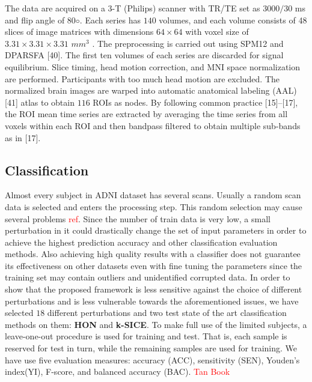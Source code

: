 \documentclass[preprint,12pt]{elsarticle}
\begin{document}
The data are acquired on a $3$-T (Philips) scanner with TR/TE set as $3000/30$
ms and flip angle of $80◦$. Each series has $140$ volumes, and each volume consists of 48 slices of image matrices with dimensions
$64 \times 64$
with voxel size of
$ 3.31 \times  3.31 \times 3.31$
$mm^3$ . The preprocessing is carried out using SPM12 and DPARSFA [40]. The
first ten volumes of each series are discarded for signal equilibrium. Slice timing, head motion correction, and MNI space normalization are performed. Participants with too much head motion are excluded. The normalized brain images are warped into automatic anatomical labeling (AAL) [41] atlas to obtain $116$ ROIs as nodes. By following common practice [15]–[17], the ROI mean time series are extracted by averaging the time series from all voxels within each ROI and then bandpass filtered to obtain multiple sub-bands as in [17].



\subsection{Classification}

Almost every subject in ADNI dataset has several scans. Usually a random scan data is selected and enters the processing step. This random selection may cause several problems \textcolor{red}{ref}. Since the number of train data is very low, a small perturbation in it could drastically change the set of input parameters in order to achieve the highest prediction accuracy and other classification evaluation methods. Also achieving high quality results with a classifier does not guarantee its effectiveness on other datasets even with fine tuning the parameters since the training set may contain outliers and unidentified corrupted data. 
In order to show that the proposed framework is less sensitive against the choice of different perturbations and is less vulnerable towards the aforementioned issues, we have selected $18$ different perturbations and two test state of the art classification methods on them: \textbf{HON} and \textbf{k-SICE}.   
To make full use of the limited subjects, a leave-one-out procedure is used for training and test. That is, each sample is reserved for test in turn, while the remaining samples are used for training.
We have use five
evaluation measures: accuracy (ACC), sensitivity (SEN), Youden’s index(YI), F-score, and balanced accuracy (BAC).
\textcolor{red}{Tan Book} 
\end{document}
